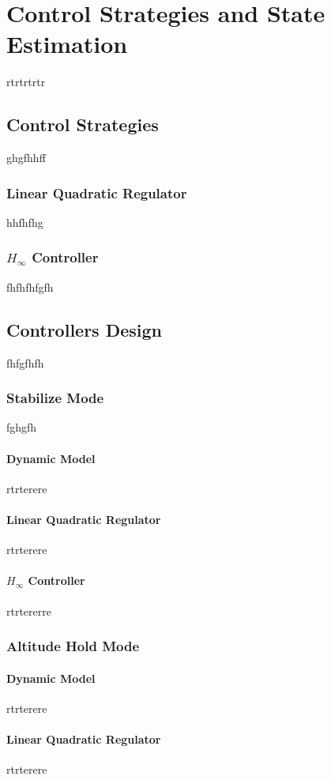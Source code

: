 \chapter{Control Strategies and State Estimation} \label{ch:controlandestimation}
rtrtrtrtr
\section{Control Strategies}
ghgfhhff
\subsection{Linear Quadratic Regulator}
hhfhfhg
\subsection{$H_\infty$ Controller}
fhfhfhfgfh
\section{Controllers Design}
fhfgfhfh
\subsection{Stabilize Mode}
fghgfh
\subsubsection{Dynamic Model}
rtrterere
\subsubsection{Linear Quadratic Regulator}
rtrterere

\subsubsection{$H_\infty$ Controller}
rtrtererre

\subsection{Altitude Hold Mode}
\subsubsection{Dynamic Model}
rtrterere
\subsubsection{Linear Quadratic Regulator}
rtrterere

